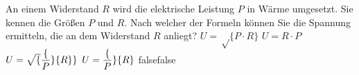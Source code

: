     {An einem Widerstand $R$ wird die elektrische Leistung $P$ in Wärme umgesetzt. Sie kennen die Größen $P$ und $R$. Nach welcher der Formeln können Sie die Spannung ermitteln, die an dem Widerstand $R$ anliegt?}
    {$U = \sqrt\{P\cdot R\}$}
    {$U = R\cdot P$}
    {$U = \sqrt\{\dfrac\{P\}\{R\}\}$}
    {$U = \dfrac\{P\}\{R\}$}
    {false}{false}